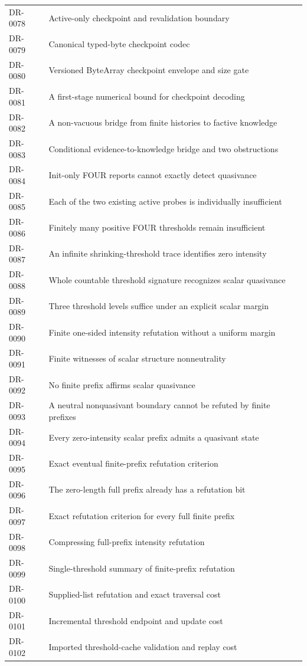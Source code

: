 \begin{longtable}{p{.14\linewidth}p{.79\linewidth}}
DR-0078 & Active-only checkpoint and revalidation boundary\\
DR-0079 & Canonical typed-byte checkpoint codec\\
DR-0080 & Versioned ByteArray checkpoint envelope and size gate\\
DR-0081 & A first-stage numerical bound for checkpoint decoding\\
DR-0082 & A non-vacuous bridge from finite histories to factive knowledge\\
DR-0083 & Conditional evidence-to-knowledge bridge and two obstructions\\
DR-0084 & Init-only FOUR reports cannot exactly detect quasivance\\
DR-0085 & Each of the two existing active probes is individually insufficient\\
DR-0086 & Finitely many positive FOUR thresholds remain insufficient\\
DR-0087 & An infinite shrinking-threshold trace identifies zero intensity\\
DR-0088 & Whole countable threshold signature recognizes scalar quasivance\\
DR-0089 & Three threshold levels suffice under an explicit scalar margin\\
DR-0090 & Finite one-sided intensity refutation without a uniform margin\\
DR-0091 & Finite witnesses of scalar structure nonneutrality\\
DR-0092 & No finite prefix affirms scalar quasivance\\
DR-0093 & A neutral nonquasivant boundary cannot be refuted by finite prefixes\\
DR-0094 & Every zero-intensity scalar prefix admits a quasivant state\\
DR-0095 & Exact eventual finite-prefix refutation criterion\\
DR-0096 & The zero-length full prefix already has a refutation bit\\
DR-0097 & Exact refutation criterion for every full finite prefix\\
DR-0098 & Compressing full-prefix intensity refutation\\
DR-0099 & Single-threshold summary of finite-prefix refutation\\
DR-0100 & Supplied-list refutation and exact traversal cost\\
DR-0101 & Incremental threshold endpoint and update cost\\
DR-0102 & Imported threshold-cache validation and replay cost\\

\end{longtable}
